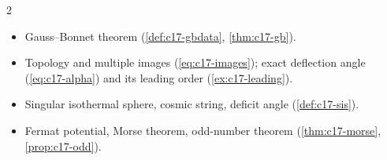 \begin{paracol}{2}
\begin{keyconcepts}
\begin{itemize}
  \item Gauss--Bonnet theorem (\cref{def:c17-gbdata}, \cref{thm:c17-gb}).
  \item Topology and multiple images (\eqref{eq:c17-images}); exact deflection angle (\eqref{eq:c17-alpha}) and its leading order (\cref{ex:c17-leading}).
  \item Singular isothermal sphere, cosmic string, deficit angle (\cref{def:c17-sis}).
  \item Fermat potential, Morse theorem, odd-number theorem (\cref{thm:c17-morse}, \cref{prop:c17-odd}).
\end{itemize}
\end{keyconcepts}

\flushside
\end{paracol}
